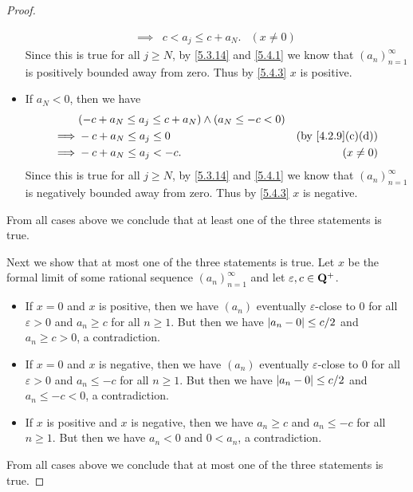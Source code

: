 \begin{proof}
\begin{itemize}
\begin{align*}
            \implies & c < a_j \leq c + a_N.                                   & (x \neq 0)
          \end{align*}
          Since this is true for all \(j \geq N\), by \cref{5.3.14} and \cref{5.4.1} we know that \((a_n)_{n = 1}^\infty\) is positively bounded away from zero.
          Thus by \cref{5.4.3} \(x\) is positive.
    \item If \(a_N < 0\), then we have
          \begin{align*}
                     & (-c + a_N \leq a_j \leq c + a_N) \land (a_N \leq -c < 0)                                  \\
            \implies & -c + a_N \leq a_j \leq 0                                 & \text{(by \cref{4.2.9}(c)(d))} \\
            \implies & -c + a_N \leq a_j < -c.                                  & (x \neq 0)
          \end{align*}
          Since this is true for all \(j \geq N\), by \cref{5.3.14} and \cref{5.4.1} we know that \((a_n)_{n = 1}^\infty\) is negatively bounded away from zero.
          Thus by \cref{5.4.3} \(x\) is negative.
  \end{itemize}
  From all cases above we conclude that at least one of the three statements is true.

  Next we show that at most one of the three statements is true.
  Let \(x\) be the formal limit of some rational sequence \((a_n)_{n = 1}^{\infty}\) and let \(\varepsilon, c \in \mathbf{Q}^+\).
  \begin{itemize}
    \item If \(x = 0\) and \(x\) is positive, then we have \((a_n)\) eventually \(\varepsilon\)-close to \(0\) for all \(\varepsilon > 0\) and \(a_n \geq c\) for all \(n \geq 1\).
          But then we have \(\left\lvert a_n - 0\right\rvert \leq c / 2\) and \(a_n \geq c > 0\), a contradiction.
    \item If \(x = 0\) and \(x\) is negative, then we have \((a_n)\) eventually \(\varepsilon\)-close to \(0\) for all \(\varepsilon > 0\) and \(a_n \leq -c\) for all \(n \geq 1\).
          But then we have \(\left\lvert a_n - 0\right\rvert \leq c / 2\) and \(a_n \leq -c < 0\), a contradiction.
    \item If \(x\) is positive and \(x\) is negative, then we have \(a_n \geq c\) and \(a_n \leq -c\) for all \(n \geq 1\).
          But then we have \(a_n < 0\) and \(0 < a_n\), a contradiction.
  \end{itemize}
  From all cases above we conclude that at most one of the three statements is true.


\end{proof}
